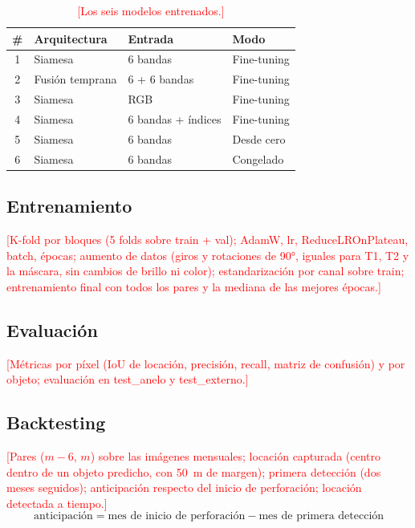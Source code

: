 \documentclass[10pt,a4paper]{article}
\newcommand{\pend}[1]{\textcolor{red}{[#1]}}
\begin{document}
\begin{table}[t]
\centering
\caption{\pend{Los seis modelos entrenados.}}
\label{tab:modelos}
\small
\begin{tabular}{@{}clll@{}}
\toprule
\# & Arquitectura & Entrada & Modo \\
\midrule
1 & Siamesa & 6 bandas & Fine-tuning \\
2 & Fusión temprana & 6 + 6 bandas & Fine-tuning \\
3 & Siamesa & RGB & Fine-tuning \\
4 & Siamesa & 6 bandas + índices & Fine-tuning \\
5 & Siamesa & 6 bandas & Desde cero \\
6 & Siamesa & 6 bandas & Congelado \\
\bottomrule
\end{tabular}
\end{table}

\subsection{Entrenamiento}
\pend{K-fold por bloques (5 folds sobre train + val); AdamW, lr, ReduceLROnPlateau, batch, épocas; aumento de datos
(giros y rotaciones de 90°, iguales para T1, T2 y la máscara, sin cambios de brillo ni color); estandarización por canal sobre train;
entrenamiento final con todos los pares y la mediana de las mejores épocas.}

\subsection{Evaluación}
\pend{Métricas por píxel (IoU de locación, precisión, recall, matriz de confusión) y por objeto; evaluación en test\_anelo y test\_externo.}

\subsection{Backtesting}
\pend{Pares ($m-6$, $m$) sobre las imágenes mensuales; locación capturada (centro dentro de un objeto predicho, con 50~m de margen);
primera detección (dos meses seguidos); anticipación respecto del inicio de perforación; locación detectada a tiempo.}
\begin{equation}
\text{anticipación} = \text{mes de inicio de perforación} - \text{mes de primera detección}
\label{eq:anticipacion}
\end{equation}
\end{document}
